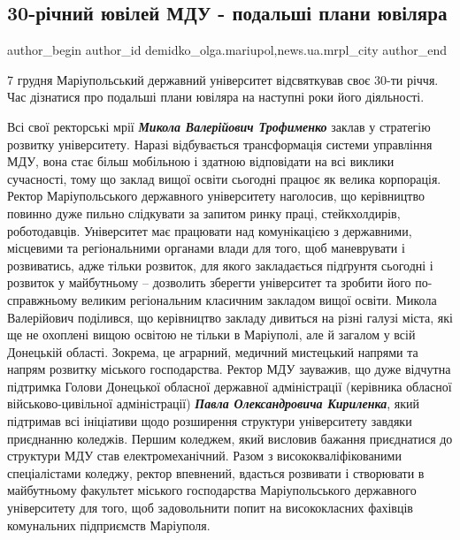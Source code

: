  
 
 
 
 
 
\subsection{30-річний ювілей МДУ - подальші плани ювіляра}
\label{sec:14_12_2021.stz.news.ua.mrpl_city.1.mdu_30_richnyj_jubilej_plany}
 
\ifcmt
 author_begin
   author_id demidko_olga.mariupol,news.ua.mrpl_city
 author_end
\fi

7 грудня Маріупольський державний університет відсвяткував своє 30-ти річчя.
Час дізнатися про подальші плани ювіляра на наступні роки його діяльності.


Всі свої ректорські мрії \emph{\textbf{Микола Валерійович Трофименко}} заклав у стратегію
розвитку університету. Наразі відбувається трансформація системи управління
МДУ, вона стає більш мобільною і здатною відповідати на всі виклики сучасності,
тому що заклад вищої освіти сьогодні працює як велика корпорація. Ректор
Маріупольського державного університету наголосив, що керівництво повинно дуже
пильно слідкувати за запитом ринку праці, стейкхолдирів, роботодавців.
Університет має працювати над комунікацією з державними, місцевими та
регіональними органами влади для того, щоб маневрувати і розвиватись, адже
тільки розвиток, для якого закладається підґрунтя сьогодні і розвиток у
майбутньому – дозволить зберегти університет та зробити його по-справжньому
великим регіональним класичним закладом вищої освіти. Микола Валерійович
поділився, що керівництво закладу дивиться на різні галузі міста, які ще не
охоплені вищою освітою не тільки в Маріуполі, але й загалом у всій Донецькій
області. Зокрема, це аграрний, медичний мистецький напрями та напрям розвитку
міського господарства. Ректор МДУ зауважив, що дуже відчутна підтримка Голови
Донецької обласної державної адміністрації (керівника обласної
військово-цивільної адміністрації) \emph{\textbf{Павла Олександровича Кириленка}}, який
підтримав всі ініціативи щодо розширення структури університету завдяки
приєднанню коледжів. Першим коледжем, який висловив бажання приєднатися до
структури МДУ став електромеханічний. Разом з висококваліфікованими
спеціалістами коледжу, ректор впевнений, вдасться розвивати і створювати в
майбутньому факультет міського господарства Маріупольського державного
університету для того, щоб задовольнити  попит на висококласних фахівців
комунальних підприємств Маріуполя.

